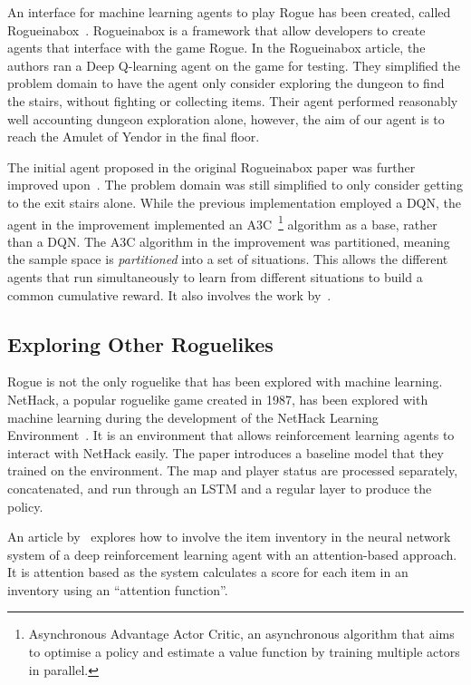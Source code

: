 \documentclass[12pt,a4paper]{article}
\begin{document}
    An interface for machine learning agents to play Rogue has been created, called Rogueinabox~\citep{asperti17}.
    Rogueinabox is a framework that allow developers to create agents that interface with the game Rogue.
    In the Rogueinabox article, the authors ran a Deep Q-learning agent on the game for testing.
    They simplified the problem domain to have the agent only consider exploring the dungeon to find the stairs, without fighting or collecting items.
    Their agent performed reasonably well accounting dungeon exploration alone, however, the aim of our agent is to reach the Amulet of Yendor in the final floor.

    The initial agent proposed in the original Rogueinabox paper was further improved upon~\citep{asperti18}.
    The problem domain was still simplified to only consider getting to the exit stairs alone.
    While the previous implementation employed a DQN, the agent in the improvement implemented an A3C~\citep{mnih15}\footnote{Asynchronous Advantage Actor Critic, an asynchronous algorithm that aims to optimise a policy and estimate a value function by training multiple actors in parallel.} algorithm as a base, rather than a DQN. The A3C algorithm in the improvement was partitioned, meaning the sample space is \emph{partitioned} into a set of situations.
    This allows the different agents that run simultaneously to learn from different situations to build a common cumulative reward.
    It also involves the work by~\citet{jaderberg16}.


    \subsection{Exploring Other Roguelikes}\label{subsec:exploring-other-roguelikes}
    Rogue is not the only roguelike that has been explored with machine learning.
    NetHack, a popular roguelike game created in 1987, has been explored with machine learning during the development of the NetHack Learning Environment~\citep{kuttler20}.
    It is an environment that allows reinforcement learning agents to interact with NetHack easily.
    The paper introduces a baseline model that they trained on the environment.
    The map and player status are processed separately, concatenated, and run through an LSTM and a regular layer to produce the policy.

    An article by~\citet{izumiya21} explores how to involve the item inventory in the neural network system of a deep reinforcement learning agent with an attention-based approach.
    It is attention based as the system calculates a score for each item in an inventory using an ``attention function''.
\end{document}
